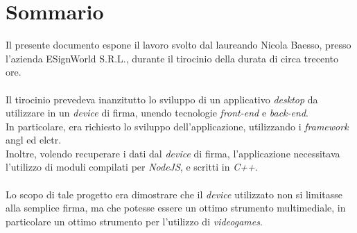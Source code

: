 \cleardoublepage
{}
{}
\begingroup
\let\clearpage\relax
\let\cleardoublepage\relax
\let\cleardoublepage\relax

\chapter*{Sommario}

Il presente documento espone il lavoro svolto dal laureando Nicola Baesso, presso l'azienda ESignWorld S.R.L., durante il tirocinio della durata di circa trecento ore.\\\\
Il tirocinio prevedeva inanzitutto lo sviluppo di un applicativo \emph{desktop} da utilizzare in un \emph{device} di firma, unendo tecnologie \emph{front-end} e \emph{back-end}.\\
In particolare, era richiesto lo sviluppo dell'applicazione, utilizzando i \emph{framework} \gls{angl} ed \gls{elctr}.\\
Inoltre, volendo recuperare i dati dal \emph{device} di firma, l'applicazione necessitava l'utilizzo di moduli compilati per \emph{NodeJS}, e scritti in \emph{C++}.\\\\
Lo scopo di tale progetto era dimostrare che il \emph{device} utilizzato non si limitasse alla semplice firma, ma che potesse essere un ottimo strumento multimediale, in particolare un ottimo strumento per l'utilizzo di \emph{videogames}.\\




\endgroup

\vfill
